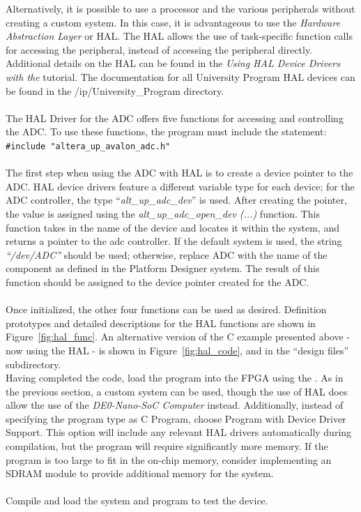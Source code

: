 \documentclass[11pt, twoside, pdftex]{article}
\begin{document}
Alternatively, it is possible to use a processor and the various peripherals without creating a custom system. In this case, it is advantageous to use the {\it Hardware Abstraction Layer} or HAL. The HAL allows the use of task-specific function calls for accessing the peripheral, instead of accessing the peripheral directly. Additional details on the HAL can be found in the {\it Using HAL Device Drivers with the \productNameMed{}} tutorial. The documentation for all University Program HAL devices can be found in the {/ip/University\_Program} directory.\\
\\
The HAL Driver for the ADC offers five functions for accessing and controlling the ADC. To use these functions, the program must include the statement:\\
\qquad\texttt{\#include "altera\_up\_avalon\_adc.h"}\\
\\
The first step when using the ADC with HAL is to create a device pointer to the ADC. HAL device drivers feature a different variable type for each device; for the ADC controller, the type ``{\it alt\_up\_adc\_dev}'' is used. After creating the pointer, the value is assigned using the {\it alt\_up\_adc\_open\_dev (...)} function. This function takes in the name of the device and locates it within the system, and returns a pointer to the adc controller. If the default system is used,  the string {\it ``/dev/ADC''} should be used; otherwise, replace ADC with the name of the component as defined in the Platform Designer system. The result of this function should be assigned to the device pointer created for the ADC.\\
\\
Once initialized, the other four functions can be used as desired. Definition prototypes and detailed descriptions for the HAL functions are shown in Figure~\ref{fig:hal_func}. An alternative version of the C example presented above - now using the HAL - is shown in Figure~\ref{fig:hal_code}, and in the ``design files'' subdirectory.\\

Having completed the code, load the program into the FPGA using the \productNameMed{}. As in the previous section, a custom system can be used, though the use of HAL does allow the use of the {\it DE0-Nano-SoC Computer} instead. Additionally, instead of specifying the program type as {\sf C Program}, choose {\sf Program with Device Driver Support}. This option will include any relevant HAL drivers automatically during compilation, but the program will require significantly more memory. If the program is too large to fit in the on-chip memory, consider implementing an SDRAM module to provide additional memory for the system.\\
\\
Compile and load the system and program to test the device.
\end{document}
